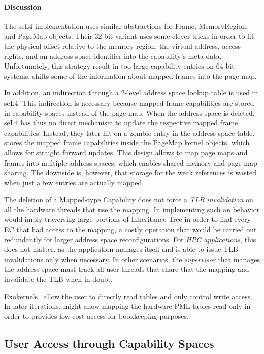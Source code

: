 \paragraph{Discussion}
The seL4 implementation uses similar abstractions for Frame, MemoryRegion, and PageMap objects. Their 32-bit variant uses some clever tricks in order to fit the physical offset relative to the memory region, the virtual address, access rights, and an address space identifier into the capability's meta-data. Unfortunately, this strategy result in too large capability entries on 64-bit systems. \mythos shifts some of the information about mapped frames into the page map.

In addition, an indirection through a 2-level address space lookup table is used in seL4. This indirection is necessary because mapped frame capabilities are stored in capability spaces instead of the page map. When the address space is deleted, seL4 has thus no direct mechanism to update the respective mapped frame capabilities. Instead, they later hit on a zombie entry in the address space table. \mythos stores the mapped frame capabilities inside the PageMap kernel objects, which allows for straight forward updates. This design allows to map page maps and frames into multiple address spaces, which enables shared memory and page map sharing. The downside is, however, that storage for the weak references is wasted when just a few entries are actually mapped.

The deletion of a Mapped-type Capability does not force a \emph{TLB invalidation} on all the hardware threads that use the mapping. In implementing such an behavior would imply traversing large portions of Inheritance Tree in order to find every EC that had access to the mapping, a costly operation that would be carried out redundantly for larger address space reconfigurations.
For \emph{HPC applications}, this does not matter, as the application manages itself and is able to issue TLB invalidations only when necessary.
In other scenarios, the \emph{supervisor} that manages the address space must track all user-threads that share that the mapping and invalidate the TLB when in doubt.

Exokernels~\cite{EnglerKaashoekOToole1995} allow the user to directly read tables and only control write access. In later iterations, \mythos might allow mapping the hardware PML tables read-only in order to provides low-cost access for bookkeeping purposes.

\subsection{User Access through Capability Spaces}
\label{sec:log:capability-spaces}

